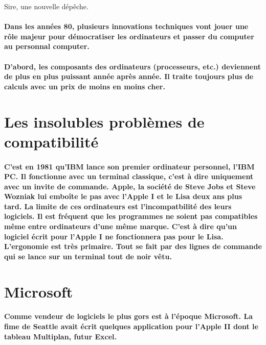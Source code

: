\og Sire, une nouvelle dépêche.

\paragraph{
  Dans les années 80, plusieurs innovations techniques vont jouer une rôle majeur pour démocratiser les ordinateurs et passer du computer au personnal computer.
}

\paragraph{
  D'abord, les composants des ordinateurs (processeurs, etc.) deviennent de plus en plus puissant année après année. Il traite toujours plus de calculs avec un prix de moins en moins cher.
}

\section*{Les insolubles problèmes de compatibilité}

\paragraph{
  C'est en 1981 qu'IBM lance son premier ordinateur personnel, l'IBM PC. Il fonctionne avec un terminal classique, c'est à dire uniquement avec un invite de commande. Apple, la société de Steve Jobs et Steve Wozniak lui emboîte le pas avec l'Apple I et le Lisa deux ans plus tard. La limite de ces ordinateurs est l'incompatbilité des leurs logiciels. Il est fréquent que les programmes ne soient pas compatibles même entre ordinateurs d'une même marque. C'est à dire qu'un logiciel écrit pour l'Apple I ne fonctionnera pas pour le Lisa. L'ergonomie est très primaire. Tout se fait par des lignes de commande qui se lance sur un terminal tout de noir vêtu.
}

\section*{Microsoft}

\paragraph{
  Comme vendeur de logiciels le plus gors est à l'époque Microsoft. La fime de Seattle avait écrit quelques application pour l'Apple II dont le tableau Multiplan, futur Excel.
}

